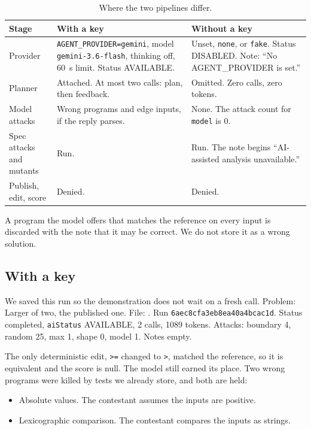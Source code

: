 \documentclass[11pt,a4paper]{article}
\begin{document}
\begin{table}[ht]
\centering
\caption{Where the two pipelines differ.}
\label{tab:split}
{\small
\begin{tabularx}{\textwidth}{@{}l Y Y@{}}
\toprule
Stage & With a key & Without a key \\
\midrule
Provider &
\texttt{AGENT\_PROVIDER=gemini}, model \texttt{gemini-3.6-flash}, thinking off, 60~s limit. Status AVAILABLE. &
Unset, \texttt{none}, or \texttt{fake}. Status DISABLED. Note: ``No AGENT\_PROVIDER is set.'' \\
Planner &
Attached. At most two calls: plan, then feedback. &
Omitted. Zero calls, zero tokens. \\
Model attacks &
Wrong programs and edge inputs, if the reply parses. &
None. The attack count for \texttt{model} is 0. \\
Spec attacks and mutants &
Run. &
Run. The note begins ``AI-assisted analysis unavailable.'' \\
Publish, edit, score &
Denied. &
Denied. \\
\bottomrule
\end{tabularx}
}
\end{table}

A program the model offers that matches the reference on every input is discarded with the note that it may be correct. We do not store it as a wrong solution.

\subsection{With a key}

We saved this run so the demonstration does not wait on a fresh call. Problem: Larger of two, the published one. File: . Run \texttt{6aec8cfa3eb8ea40a4bcac1d}. Status completed, \texttt{aiStatus} AVAILABLE, 2 calls, 1089 tokens. Attacks: boundary 4, random 25, max 1, shape 0, model 1. Notes empty.

The only deterministic edit, \texttt{>=} changed to \texttt{>}, matched the reference, so it is equivalent and the score is null. The model still earned its place. Two wrong programs were killed by tests we already store, and both are held:

\begin{itemize}
\item Absolute values. The contestant assumes the inputs are positive.
\item Lexicographic comparison. The contestant compares the inputs as strings.
\end{itemize}
\end{document}
